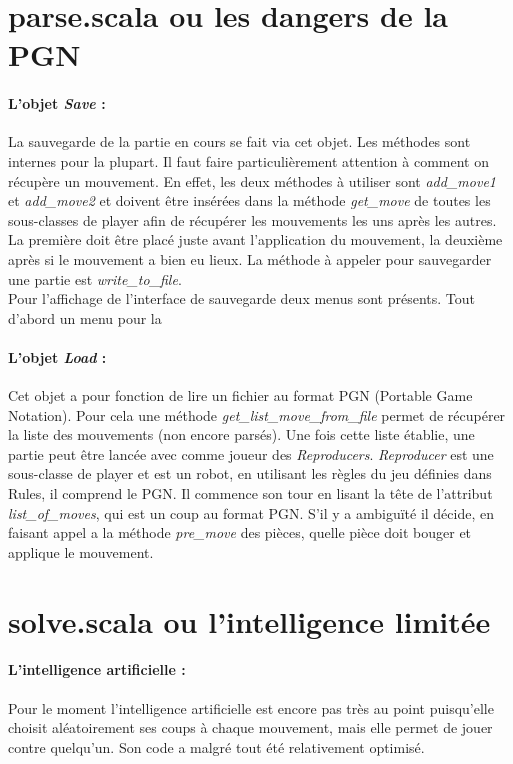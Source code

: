 \documentclass[a4paper]{article}
\begin{document}
\section{parse.scala ou les dangers de la PGN}

\paragraph{L'objet \textit{Save} :} La sauvegarde de la partie en cours se fait via cet objet. Les méthodes sont internes pour la plupart. Il faut faire particulièrement attention à comment on récupère un mouvement. En effet, les deux méthodes à utiliser sont \textit{add\_move1} et \textit{add\_move2} et doivent être insérées dans la méthode \textit{get\_move} de toutes les sous-classes de player afin de récupérer les mouvements les uns après les autres. La première doit être placé juste avant l'application du mouvement, la deuxième après si le mouvement a bien eu lieux. La méthode à appeler pour sauvegarder une partie est \textit{write\_to\_file}. \\

Pour l'affichage de l'interface de sauvegarde deux menus sont présents. Tout d'abord un menu pour la

\paragraph{L'objet \textit{Load} :} Cet objet a pour fonction de lire un fichier au format PGN (Portable Game Notation). Pour cela une méthode \textit{get\_list\_move\_from\_file} permet de récupérer la liste des mouvements (non encore parsés). Une fois cette liste établie, une partie peut être lancée avec comme joueur des \textit{Reproducers}. \textit{Reproducer} est une sous-classe de player et est un robot, en utilisant les règles du jeu définies dans Rules, il comprend le PGN. Il commence son tour en lisant la tête de l'attribut \textit{list\_of\_moves}, qui est un coup au format PGN. S'il y a ambiguïté il décide, en faisant appel a la méthode \textit{pre\_move} des pièces, quelle pièce doit bouger et applique le mouvement.

\section{solve.scala ou l'intelligence limitée}

\paragraph{L'intelligence artificielle :}Pour le moment l'intelligence artificielle est encore pas très au point puisqu'elle choisit aléatoirement ses coups à chaque mouvement, mais elle permet de jouer contre quelqu'un. Son code a malgré tout été relativement optimisé. 
\end{document}
